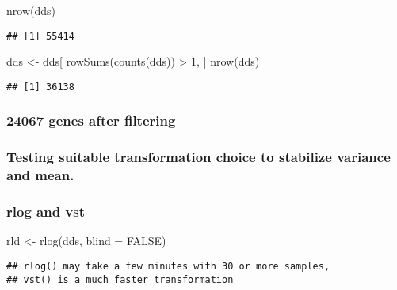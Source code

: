 \documentclass[
]{article}
\newenvironment{Shaded}{\begin{snugshade}}{\end{snugshade}}
\newcommand{\AttributeTok}[1]{\textcolor[rgb]{0.77,0.63,0.00}{#1}}
\newcommand{\ConstantTok}[1]{\textcolor[rgb]{0.00,0.00,0.00}{#1}}
\newcommand{\DecValTok}[1]{\textcolor[rgb]{0.00,0.00,0.81}{#1}}
\newcommand{\FunctionTok}[1]{\textcolor[rgb]{0.00,0.00,0.00}{#1}}
\newcommand{\NormalTok}[1]{#1}
\newcommand{\OtherTok}[1]{\textcolor[rgb]{0.56,0.35,0.01}{#1}}
\newcommand{\SpecialCharTok}[1]{\textcolor[rgb]{0.00,0.00,0.00}{#1}}
\begin{document}
\begin{Shaded}
\begin{Highlighting}[]
\FunctionTok{nrow}\NormalTok{(dds)}
\end{Highlighting}
\end{Shaded}

\begin{verbatim}
## [1] 55414
\end{verbatim}

\begin{Shaded}
\begin{Highlighting}[]
\NormalTok{dds }\OtherTok{\textless{}{-}}\NormalTok{ dds[ }\FunctionTok{rowSums}\NormalTok{(}\FunctionTok{counts}\NormalTok{(dds)) }\SpecialCharTok{\textgreater{}} \DecValTok{1}\NormalTok{, ]}
\FunctionTok{nrow}\NormalTok{(dds)}
\end{Highlighting}
\end{Shaded}

\begin{verbatim}
## [1] 36138
\end{verbatim}

\hypertarget{genes-after-filtering}{%
\subsubsection{24067 genes after
filtering}\label{genes-after-filtering}}

\hypertarget{testing-suitable-transformation-choice-to-stabilize-variance-and-mean.}{%
\subsubsection{Testing suitable transformation choice to stabilize
variance and
mean.}\label{testing-suitable-transformation-choice-to-stabilize-variance-and-mean.}}

\hypertarget{rlog-and-vst}{%
\subsubsection{rlog and vst}\label{rlog-and-vst}}

\begin{Shaded}
\begin{Highlighting}[]
\NormalTok{rld }\OtherTok{\textless{}{-}} \FunctionTok{rlog}\NormalTok{(dds, }\AttributeTok{blind =} \ConstantTok{FALSE}\NormalTok{)}
\end{Highlighting}
\end{Shaded}

\begin{verbatim}
## rlog() may take a few minutes with 30 or more samples,
## vst() is a much faster transformation
\end{verbatim}
\end{document}
